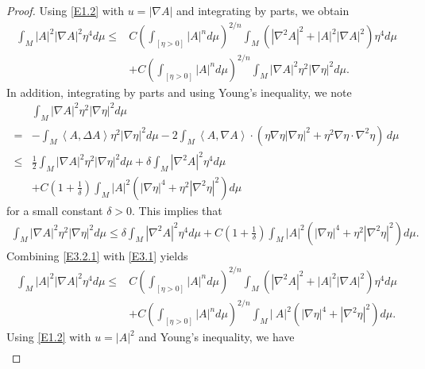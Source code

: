 \documentclass{amsart}
\theoremstyle{definition}
\numberwithin{equation}{section}
\begin{document}
\begin{proof}
Using  \eqref{E1.2} with $u=|\nabla A|$ and integrating by parts, we obtain
\begin{align}\label{E3.1}
       \int_{M}|A|^2  |\nabla A|^2 \eta^4 d\mu \leq & C\left ( \int_{[\eta >0]} \left| A \right|^{n} d\mu \right )^{2/n}
        \int_{M}  ( |   \nabla^{2} A|^2 + |A|^2 |\nabla A|^2)  \eta^4  d\mu
        \\
       & + C \left ( \int_{[\eta >0]} \left| A \right|^{n} d\mu \right )^{2/n} \int_{M}|\nabla  A|^{2} \eta^2 |\nabla \eta|^2
       d\mu\nonumber.
\end{align}
In addition, integrating by parts and using Young's inequality, we note
\begin{align}\label{E3.2}
       & \int_{M}   |   \nabla  A|^2  \eta^2 |\nabla \eta|^2  d\mu \\
       =&-\int_{M}   \left <A,   \Delta  A\right > \eta^2 |\nabla \eta|^2  d\mu -2\int_{M}   \left <A,   \nabla A\right > \cdot (\eta \nabla
       \eta
       |\nabla \eta|^2 +\eta^2 \nabla \eta \cdot \nabla^2 \eta)\, d\mu\nonumber\\
        \leq & \frac 12   \int_{M}   |   \nabla  A|^2  \eta^2 |\nabla \eta|^2  d\mu + \delta \int_{M}|\nabla^2 A|^{2} \eta^4  d\mu
        \nonumber\\
        &+C(1+\frac 1{\delta} ) \int_{M} |A|^2 (|\nabla
        \eta|^4+\eta^2|\nabla^2 \eta|^2)
       d\mu  \nonumber
\end{align} for a small constant $\delta>0$.
This implies that
\begin{align}\label{E3.2.1}
        \int_{M}   |   \nabla  A|^2  \eta^2 |\nabla \eta|^2  d\mu
        \leq  \delta \int_{M}|\nabla^2 A|^{2} \eta^4  d\mu +   C(1+\frac 1{\delta} )\int_{M}  |A|^2 (|\nabla
        \eta|^4+\eta^2 |\nabla^2 \eta|^2)
       d\mu .
\end{align}
Combining \eqref{E3.2.1} with \eqref{E3.1} yields
\begin{align}\label{E2}
       \int_{M}|A|^2  |\nabla A|^2 \eta^4 d\mu \leq & C\left ( \int_{[\eta >0]} \left| A \right|^{n} d\mu \right )^{2/n}
        \int_{M}  ( |\nabla^{2} A|^2 + |A|^2 |\nabla A|^2)  \eta^4  d\mu
        \\
       & + C \left ( \int_{[\eta >0]} \left| A \right|^{n} d\mu \right )^{2/n} \int_{M}|\ A|^{2}(|\nabla \eta|^4+|\nabla^2\eta |^2)
       d\mu\nonumber.
\end{align}
Using     \eqref{E1.2} with $u=|A|^2$ and Young's inequality, we have
\begin{align}\label{E1}

\end{align}
\end{proof}
\end{document}
